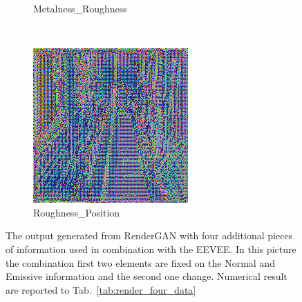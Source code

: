 \begin{figure}[h!]
\begin{subfigure}[b]{0.175\textwidth}
     \caption{Metalness_Roughness}
    \end{subfigure}
    ~
    \begin{subfigure}[b]{0.175\textwidth}
     \includegraphics[width=\textwidth]{figures/result/quadruple/normal_emissive_roughness_position/2.png}
     \caption{Roughness_Position}
    \end{subfigure}
    \caption[Generation Result with fixed input on Normal and Emissive]{The output generated from RenderGAN with four additional pieces of information used in combination with the EEVEE. In this picture the combination first two elements are fixed on the Normal and Emissive information and the second one change. Numerical result are reported to Tab.~\ref{tab:render_four_data}}
    \label{fig:quadruple_input_base_normal_emissive}
\end{figure}

